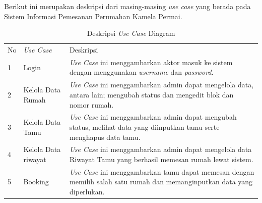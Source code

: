 \par Berikut ini merupakan deskripsi dari masing-masing \textit{use case} yang berada pada Sistem Informasi Pemesanan Perumahan Kamela Permai.
\begin{longtable}[c]{|l|l|p{9cm}|} %
\captionsetup{position=above} %
\caption{Deskripsi \textit{Use Case} Diagram}
\label{tab:my-table}\\
\hline
No & \textit{Use Case}          & Deskripsi                                                                                                                                                                                      \\ \hline
\endfirsthead
\endhead
%
1  & Login             & \textit{Use Case} ini menggambarkan aktor masuk ke sistem dengan menggunakan \textit{username} dan \textit{password}.                                      \\ \hline
2  & Kelola Data Rumah     & \textit{Use Case} ini menggambarkan admin dapat mengelola data, antara lain; mengubah status dan mengedit blok dan nomor rumah.                                                                                                                   \\ \hline
3  & Kelola Data Tamu         & \textit{Use Case} ini menggambarkan admin dapat mengubah status, melihat data yang diinputkan tamu serte menghapus data tamu.                                                                            \\ \hline
4  & Kelola Data riwayat    & \textit{Use Case} ini menggambarkan admin dapat mengelola data Riwayat Tamu yang berhasil memesan rumah lewat sistem.               \\ \hline
5  & Booking    & \textit{Use Case} ini menggambarkan tamu dapat memesan dengan memilih salah satu rumah dan memanginputkan data yang diperlukan. \\ \hline
\end{longtable}

